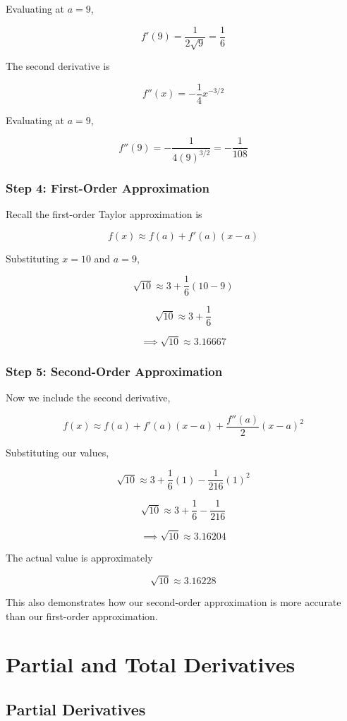\documentclass[12pt]{article}
\begin{document}
Evaluating at $a=9$,

\[
f'(9)=\frac{1}{2\sqrt{9}}=\frac{1}{6}
\]

The second derivative is

\[
f''(x)=-\frac{1}{4}x^{-3/2}
\]

Evaluating at $a=9$,

\[
f''(9)=-\frac{1}{4(9)^{3/2}}
=-\frac{1}{108}
\]

\subsubsection*{Step 4: First-Order Approximation}

Recall the first-order Taylor approximation is

\[
f(x)\approx f(a)+f'(a)(x-a)
\]

Substituting $x=10$ and $a=9$,

\[
\sqrt{10}
\approx
3+\frac{1}{6}(10-9)
\]

\[
\sqrt{10}\approx 3+\frac{1}{6}
\]

\[ \implies 
\sqrt{10}\approx 3.16667
\]

\subsubsection*{Step 5: Second-Order Approximation}

Now we include the second derivative,

\[
f(x)
\approx
f(a)+f'(a)(x-a)
+\frac{f''(a)}{2}(x-a)^2
\]

Substituting our values,

\[
\sqrt{10}
\approx
3+\frac{1}{6}(1)
-\frac{1}{216}(1)^2
\]

\[
\sqrt{10}
\approx
3+\frac{1}{6}-\frac{1}{216}
\]

\[ \implies 
\sqrt{10}\approx 3.16204
\]

The actual value is approximately

\[
\sqrt{10}\approx 3.16228
\]

This also demonstrates how our second-order approximation is more accurate
than our first-order approximation.

\section{Partial and Total Derivatives}

\subsection{Partial Derivatives}
\end{document}
